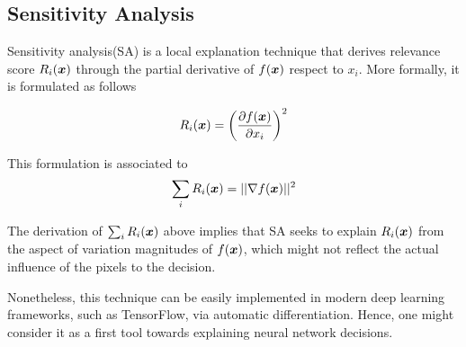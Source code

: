 %

\subsection{Sensitivity Analysis}
Sensitivity analysis(SA)\cite{SimonyanDeepConvolutionalNetworks2013} is a local explanation technique that derives relevance score $R_i(\boldsymbol{x})$ through the  partial derivative of $f(\patvector{x})$ respect to $x_i$. More formally, it is formulated as follows 

\begin{align}
	R_i(\x) =
	 \bigg( \frac{\partial f(\patvector{x})}{ \partial x_i } \bigg)^2
\end{align}

This formulation is associated to
\begin{align}
	\sum_i R_i(\x) = || \nabla f(\patvector{x}) ||^2
\end{align}

The derivation of $\sum_i R_i(\boldsymbol{x})$ above implies that SA seeks to explain $R_i(\boldsymbol{x})$ from the aspect of variation magnitudes of $f(\boldsymbol{x})$, which might not reflect the actual influence of the pixels to the decision.

Nonetheless, this technique can be easily implemented in modern deep learning frameworks, such as TensorFlow\cite{AbadiTensorFlowLargeScaleMachine2016}, via automatic differentiation. Hence, one might consider it as a first tool towards explaining neural network decisions.

